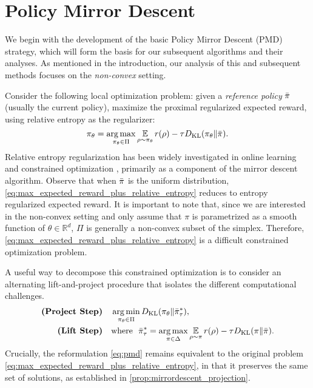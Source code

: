 
\section{Policy Mirror Descent}
\label{subsec:revisitTRPO}

\newcommand{\real}{\mathbb{R}}


We begin with the development of the basic Policy Mirror Descent (PMD) strategy,
which will form the basis for our subsequent algorithms and their analyses.
As mentioned in the introduction, our analysis of this and subsequent methods
focuses on the \emph{non-convex} setting.

Consider the following local optimization problem:
given a \emph{reference policy} $\bar{\pi}$ (usually the current policy), 
maximize the proximal regularized expected reward,
using relative entropy as the regularizer:
%
\begin{equation}
\label{eq:max_expected_reward_plus_relative_entropy}
\pi_{\theta} = \operatorname*{arg\,max}\limits_{\pi_\theta \in \Pi} { \operatorname*{\mathbb{E}}\limits_{\rho \sim \pi_\theta}{  r(\rho)  - \tau D_{\mathrm{KL}}(\pi_\theta \| \bar{\pi}) } }.
\end{equation}
%
Relative entropy regularization has been widely investigated in
online learning and constrained optimization
\citep{nemirovskii1983problem,beck2003mirror},
primarily as a component of the mirror descent algorithm.
Observe that when $\bar{\pi}$ is the uniform distribution,
\cref{eq:max_expected_reward_plus_relative_entropy}
reduces to entropy regularized expected reward.
It is important to note that,
since we are interested in the non-convex setting
and only assume that
$\pi$ is parametrized as a smooth
function of $\theta \in \real^d$,
$\Pi$ is generally a non-convex subset of the simplex.
Therefore, 
\cref{eq:max_expected_reward_plus_relative_entropy}
is a difficult constrained optimization problem.

A useful way to decompose this constrained optimization
is to consider an alternating lift-and-project procedure
that isolates the different computational challenges.
%
\begin{equation}
\label{eq:pmd}
\begin{split}
\text{\bf (Project Step)} \quad &\operatorname*{arg\,min}\limits_{\pi_\theta \in \Pi}{D_{\mathrm{KL}}( \pi_\theta \| \bar{\pi}_{\tau}^* )}, \\
\text{\bf (Lift Step)}  \quad & \text{where}\ \ \bar{\pi}_{\tau}^* =  \operatorname*{arg\,max}\limits_{\pi \in \Delta}{ \operatorname*{\mathbb{E}}\limits_{\rho \sim \pi}{  r(\rho)  - \tau D_{\mathrm{KL}}(\pi \| \bar{\pi}) } }. 
\end{split}
\end{equation}
%
Crucially, the reformulation \cref{eq:pmd} remains equivalent to the
original problem \cref{eq:max_expected_reward_plus_relative_entropy},
in that it preserves the same set of solutions,
as established in \cref{prop:mirrordescent_projection}.

